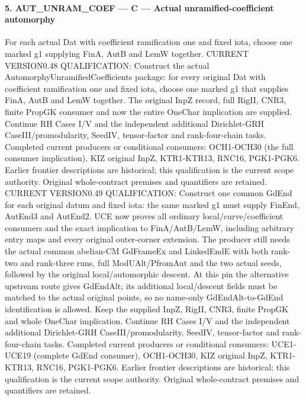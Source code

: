 \documentclass[11pt,a4paper]{article}
\numberwithin{equation}{section}
\theoremstyle{remark}\newtheorem{remark}[theorem]{Remark}
\begin{document}
\paragraph{5. AUT\_\allowbreak UNRAM\_\allowbreak COEF — C — Actual unramified-coefficient automorphy}

For each actual Dat with coefficient ramification one and fixed iota, choose one marked g1 supplying FinA, AutB and LemW together. CURRENT VERSION0.48 QUALIFICATION: Construct the actual AutomorphyUnramifiedCoefficients package: for every original Dat with coefficient ramification one and fixed iota, choose one marked g1 that supplies FinA, AutB and LemW together. The original InpZ record, full RigII, CNR3, finite PropGK consumer and now the entire OneChar implication are supplied. Continue RH Cases I/V and the independent additional Dirichlet-GRH CaseIII/promodularity, SeedIV, tensor-factor and rank-four-chain tasks. Completed current producers or conditional consumers: OCH1-OCH30 (the full consumer implication), KIZ original InpZ, KTR1-KTR13, RNC16, PGK1-PGK6. Earlier frontier descriptions are historical; this qualification is the current scope authority. Original whole-contract premises and quantifiers are retained. CURRENT VERSION0.49 QUALIFICATION: Construct one common GdEnd for each original datum and fixed iota: the same marked g1 must supply FinEnd, AutEnd3 and AutEnd2. UCE now proves all ordinary local/curve/coefficient consumers and the exact implication to FinA/AutB/LemW, including arbitrary entry maps and every original outer-corner extension. The producer still needs the actual common abelian-CM GdFrameEx and LinkedEndE with both rank-two and rank-three runs, full ModUAlt/PfromAut and the two actual seeds, followed by the original local/automorphic descent. At this pin the alternative upstream route gives GdEndAlt; its additional local/descent fields must be matched to the actual original points, so no name-only GdEndAlt-to-GdEnd identification is allowed. Keep the supplied InpZ, RigII, CNR3, finite PropGK and whole OneChar implication. Continue RH Cases I/V and the independent additional Dirichlet-GRH CaseIII/promodularity, SeedIV, tensor-factor and rank-four-chain tasks. Completed current producers or conditional consumers: UCE1-UCE19 (complete GdEnd consumer), OCH1-OCH30, KIZ original InpZ, KTR1-KTR13, RNC16, PGK1-PGK6. Earlier frontier descriptions are historical; this qualification is the current scope authority. Original whole-contract premises and quantifiers are retained.
\end{document}
